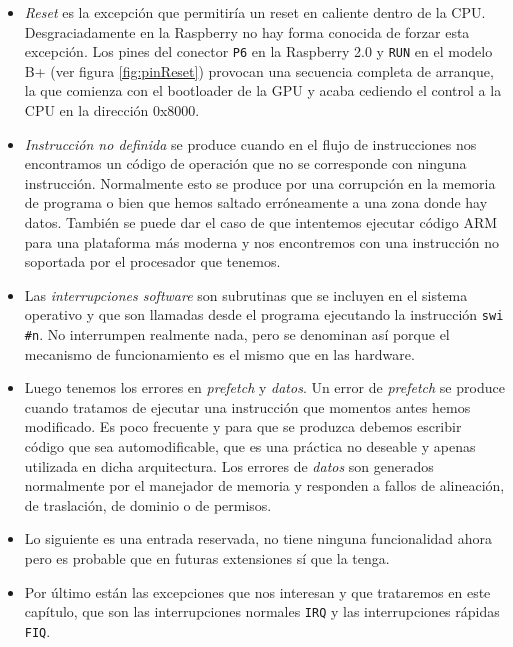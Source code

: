 \begin{itemize}
  \item {\it Reset} es la excepción que permitiría un reset en caliente dentro de la CPU.
Desgraciadamente en la Raspberry no hay forma conocida de forzar esta excepción. Los pines
del conector {\tt P6} en la Raspberry 2.0 y {\tt RUN} en el modelo B+ (ver figura \ref{fig:pinReset})
provocan una secuencia completa de arranque, la que comienza con el bootloader de la GPU y acaba cediendo el control
a la CPU en la dirección 0x8000.

  \item {\it Instrucción no definida} se produce cuando en el flujo de instrucciones nos encontramos
un código de operación que no se corresponde con ninguna instrucción. Normalmente esto se
produce por una corrupción en la memoria de programa o bien que hemos saltado erróneamente
a una zona donde hay datos. También se puede dar el caso de que intentemos ejecutar código
ARM para una plataforma más moderna y nos encontremos con una instrucción no soportada por el
procesador que tenemos.

  \item Las {\it interrupciones software} son subrutinas que se incluyen en el
sistema operativo y que son llamadas desde el programa ejecutando la
instrucción {\tt swi \#n}. No interrumpen realmente nada, pero se
denominan así porque el mecanismo de funcionamiento es el mismo que en
las hardware.

  \item Luego tenemos los errores en {\it prefetch} y {\it datos}. Un error de {\it prefetch} se produce
cuando tratamos de ejecutar una instrucción que momentos antes hemos modificado. Es poco
frecuente y para que se produzca debemos escribir código que sea automodificable, que es
una práctica no deseable y apenas utilizada en dicha arquitectura. Los errores de {\it datos}
son generados normalmente por el manejador de memoria y responden a fallos de alineación, de
traslación, de dominio o de permisos.

  \item Lo siguiente es una entrada reservada, no tiene ninguna funcionalidad ahora
pero es probable que en futuras extensiones sí que la tenga.

  \item Por último están las excepciones que nos interesan y que trataremos en este capítulo, que son
las interrupciones normales {\tt IRQ} y las interrupciones rápidas {\tt FIQ}.
\end{itemize}

